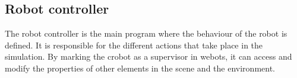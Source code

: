 








\subsection{Robot controller}

The robot controller is the main program where the behaviour of the robot is defined. It is responsible for the different actions that take place in the simulation. By marking the crobot as a supervisor in webots, it can access and modify the properties of other elements in the scene and the environment. 

